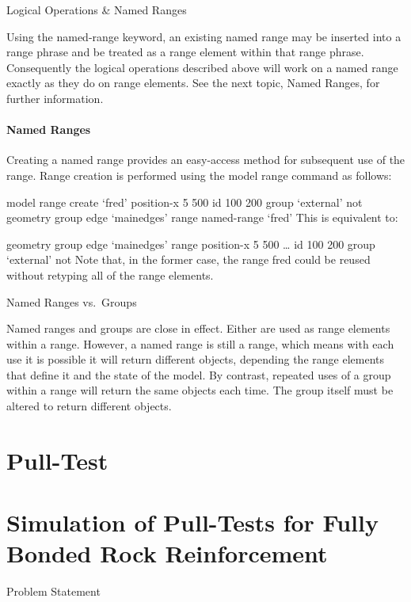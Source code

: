 \documentclass[a4paper, nobind]{templates/ociamthesis}
\begin{document}
Logical Operations \& Named Ranges

Using the named-range keyword, an existing named range may be inserted
into a range phrase and be treated as a range element within that range
phrase. Consequently the logical operations described above will work on
a named range exactly as they do on range elements. See the next topic,
Named Ranges, for further information.

\hypertarget{named-ranges}{%
\subsubsection{Named Ranges}\label{named-ranges}}

Creating a named range provides an easy-access method for subsequent use
of the range. Range creation is performed using the model range command
as follows:

model range create `fred' position-x 5 500 id 100 200 group `external'
not geometry group edge `mainedges' range named-range `fred' This is
equivalent to:

geometry group edge `mainedges' range position-x 5 500 \ldots{} id 100 200
group `external' not Note that, in the former case, the range fred could
be reused without retyping all of the range elements.

Named Ranges vs.~Groups

Named ranges and groups are close in effect. Either are used as range
elements within a range. However, a named range is still a range, which
means with each use it is possible it will return different objects,
depending the range elements that define it and the state of the model.
By contrast, repeated uses of a group within a range will return the
same objects each time. The group itself must be altered to return
different objects.

\hypertarget{pull-test}{%
\chapter{Pull-Test}\label{pull-test}}

\hypertarget{simulation-of-pull-tests-for-fully-bonded-rock-reinforcement}{%
\chapter{Simulation of Pull-Tests for Fully Bonded Rock Reinforcement}\label{simulation-of-pull-tests-for-fully-bonded-rock-reinforcement}}

Problem Statement
\end{document}
